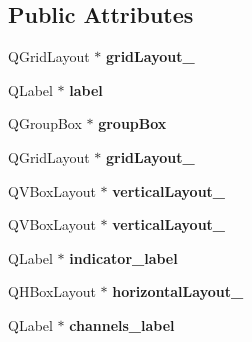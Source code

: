 \subsection*{Public Attributes}
\begin{DoxyCompactItemize}
\item 
\hypertarget{class_ui__process_dialog_a66827385f230de1a247c233393d42a4c}{
QGridLayout $\ast$ {\bfseries gridLayout\_}}
\label{class_ui__process_dialog_a66827385f230de1a247c233393d42a4c}

\item 
\hypertarget{class_ui__process_dialog_a6a72369b3dc2740c3830c7417521ae63}{
QLabel $\ast$ {\bfseries label}}
\label{class_ui__process_dialog_a6a72369b3dc2740c3830c7417521ae63}

\item 
\hypertarget{class_ui__process_dialog_ab933a0d256b6915f7b28701e724c08fa}{
QGroupBox $\ast$ {\bfseries groupBox}}
\label{class_ui__process_dialog_ab933a0d256b6915f7b28701e724c08fa}

\item 
\hypertarget{class_ui__process_dialog_afbd86e899c6b0976e799620569a18449}{
QGridLayout $\ast$ {\bfseries gridLayout\_}}
\label{class_ui__process_dialog_afbd86e899c6b0976e799620569a18449}

\item 
\hypertarget{class_ui__process_dialog_a2196ade2f39330ae213922cb2408c7cc}{
QVBoxLayout $\ast$ {\bfseries verticalLayout\_}}
\label{class_ui__process_dialog_a2196ade2f39330ae213922cb2408c7cc}

\item 
\hypertarget{class_ui__process_dialog_a0a56fe58abd4f07ab729ff42f2e9bde6}{
QVBoxLayout $\ast$ {\bfseries verticalLayout\_}}
\label{class_ui__process_dialog_a0a56fe58abd4f07ab729ff42f2e9bde6}

\item 
\hypertarget{class_ui__process_dialog_adf64ec8b3747d17367e76eb14e8b7cd9}{
QLabel $\ast$ {\bfseries indicator\_\-label}}
\label{class_ui__process_dialog_adf64ec8b3747d17367e76eb14e8b7cd9}

\item 
\hypertarget{class_ui__process_dialog_a5ed0ac96dfe7e6d24a3f127089e064b1}{
QHBoxLayout $\ast$ {\bfseries horizontalLayout\_}}
\label{class_ui__process_dialog_a5ed0ac96dfe7e6d24a3f127089e064b1}

\item 
\hypertarget{class_ui__process_dialog_afae559438bd7e27fa8ee67aa04c46409}{
QLabel $\ast$ {\bfseries channels\_\-label}}
\label{class_ui__process_dialog_afae559438bd7e27fa8ee67aa04c46409}


\end{DoxyCompactItemize}
